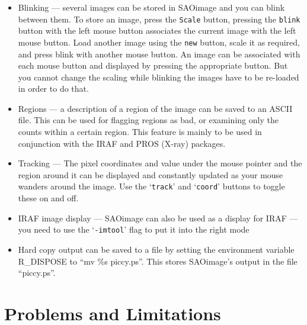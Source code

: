 \begin{itemize}

\item{Blinking --- several images can be stored in SAOimage and you can blink
between them. To store an image, press the {\tt Scale} button,
pressing the {\tt blink} button with the left mouse button associates
the current image with the left mouse button. Load another image
using the {\tt new} button, scale it as required, and press blink with
another mouse button. An image can be associated with each mouse
button and displayed by pressing the appropriate button. But you cannot
change the scaling while blinking the images have to be re-loaded in
order to do that.}

\item{Regions --- a description of a region of the image can be saved to an
ASCII file. This can be used for flagging regions as bad, or examining only
the counts within a certain region. This feature is mainly to be used in
conjunction with the IRAF and PROS (X-ray) packages.}

\item{Tracking --- The pixel coordinates and value under the mouse pointer and
the region around it can be displayed and constantly updated as your mouse
wanders around the image. Use  the `{\tt track}' and `{\tt coord}' buttons to
toggle these on and off.}

\item{IRAF image display --- SAOimage can also be used as a display for IRAF
--- you need to use the `{\tt -imtool}' flag to put it into the right mode}

\item{Hard copy output can be saved to a file by setting the environment
variable R\_DISPOSE to ``mv \%s piccy.ps''. This stores SAOimage's
output in the file ``piccy.ps''.}

\end{itemize}

\section{Problems and Limitations}


